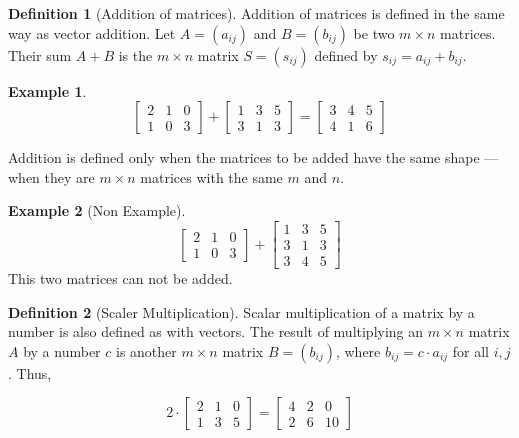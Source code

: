 \documentclass[
]{book}
\theoremstyle{definition}
\newtheorem{definition}{Definition}[chapter]
\theoremstyle{definition}
\newtheorem{example}{Example}[chapter]
\theoremstyle{definition}
\theoremstyle{definition}
\theoremstyle{remark}
\begin{document}
\begin{definition}[Addition of matrices]
\protect\hypertarget{def:unnamed-chunk-3}{}\label{def:unnamed-chunk-3}Addition of matrices is defined in the same way as vector addition. Let \(A = (a_{ij})\) and \(B = (b_{ij})\) be two \(m \times n\) matrices. Their sum \(A + B\) is the \(m \times n\) matrix \(S = (s_{ij})\) defined by \(s_{ij} = a_{ij} + b_{ij}\).
\end{definition}

\begin{example}
\protect\hypertarget{exm:unnamed-chunk-4}{}\label{exm:unnamed-chunk-4}\[\begin{bmatrix} 2 & 1 & 0 \\ 1 & 0 & 3 \end{bmatrix} +
  \begin{bmatrix}  1 & 3 & 5\\3 & 1 & 3 \end{bmatrix}=\begin{bmatrix} 3 & 4 & 5\\4 & 1 & 6 \end{bmatrix}\]
\end{example}

Addition is defined only when the matrices to be added have the same shape --- when they are \(m \times n\) matrices with the same \(m\) and \(n\).

\begin{example}[Non Example]
\protect\hypertarget{exm:unnamed-chunk-5}{}\label{exm:unnamed-chunk-5}\[\begin{bmatrix} 2 & 1 & 0 \\ 1 & 0 & 3 \end{bmatrix} +
  \begin{bmatrix}  1 & 3 & 5\\3 & 1 & 3 \\ 3 & 4 & 5 \end{bmatrix}\]
This two matrices can not be added.
\end{example}

\begin{definition}[Scaler Multiplication]
\protect\hypertarget{def:unnamed-chunk-6}{}\label{def:unnamed-chunk-6}Scalar multiplication of a matrix by a number is also defined as with vectors. The result of multiplying an \(m \times n\) matrix \(A\) by a number \(c\) is another \(m \times n\) matrix \(B = (b_{ij})\), where \(b_{ij} = c \cdot a_{ij}\) for all \(i, j\). Thus,

\[
2 \cdot \begin{bmatrix} 2 & 1 & 0 \\ 1 & 3 & 5 \end{bmatrix}  = \begin{bmatrix} 4 & 2 & 0 \\ 2 & 6 & 10 \end{bmatrix}
\]
\end{definition}
\end{document}
